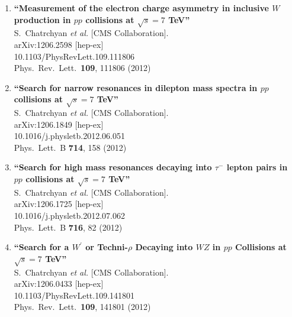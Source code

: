 \documentclass{article}
\begin{document}
\begin{enumerate}
\item%
{\bf ``Measurement of the electron charge asymmetry in inclusive $W$ production in $pp$ collisions at $\sqrt{s}=7$ TeV''}
  \\{}S.~Chatrchyan {\it et al.}  [CMS Collaboration].
  \\{}arXiv:1206.2598 [hep-ex]
    \\{}10.1103/PhysRevLett.109.111806
\\{}Phys.\ Rev.\ Lett.\  {\bf 109}, 111806 (2012) %


\item%
{\bf ``Search for narrow resonances in dilepton mass spectra in $pp$ collisions at $\sqrt{s}=7$ TeV''}
  \\{}S.~Chatrchyan {\it et al.}  [CMS Collaboration].
  \\{}arXiv:1206.1849 [hep-ex]
    \\{}10.1016/j.physletb.2012.06.051
\\{}Phys.\ Lett.\ B {\bf 714}, 158 (2012) %


\item%
{\bf ``Search for high mass resonances decaying into $\tau^-$ lepton pairs in $pp$ collisions at $\sqrt{s}=7$ TeV''}
  \\{}S.~Chatrchyan {\it et al.}  [CMS Collaboration].
  \\{}arXiv:1206.1725 [hep-ex]
    \\{}10.1016/j.physletb.2012.07.062
\\{}Phys.\ Lett.\ B {\bf 716}, 82 (2012) %


\item%
{\bf ``Search for a $W^\prime$ or Techni-$\rho$ Decaying into $WZ$ in $pp$ Collisions at $\sqrt{s}=7$ TeV''}
  \\{}S.~Chatrchyan {\it et al.}  [CMS Collaboration].
  \\{}arXiv:1206.0433 [hep-ex]
    \\{}10.1103/PhysRevLett.109.141801
\\{}Phys.\ Rev.\ Lett.\  {\bf 109}, 141801 (2012) %



\end{enumerate}
\end{document}
